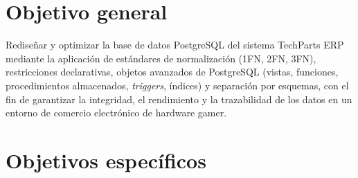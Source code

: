 
\section{Objetivo general}

Rediseñar y optimizar la base de datos PostgreSQL del sistema TechParts ERP mediante la aplicación de estándares de normalización (1FN, 2FN, 3FN), restricciones declarativas, objetos avanzados de PostgreSQL (vistas, funciones, procedimientos almacenados, \textit{triggers}, índices) y separación por esquemas, con el fin de garantizar la integridad, el rendimiento y la trazabilidad de los datos en un entorno de comercio electrónico de hardware gamer.

\section{Objetivos específicos}

